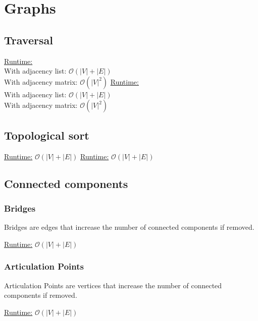 \section{Graphs}
\subsection{Traversal}

\underline{Runtime:}\\
With adjacency list: $\mathcal{O}(\lvert V \rvert + \lvert E \rvert)$ \\
With adjacency matrix: $\mathcal{O}(\lvert V \rvert^2)$
\underline{Runtime:}\\
With adjacency list: $\mathcal{O}(\lvert V \rvert + \lvert E \rvert)$ \\
With adjacency matrix: $\mathcal{O}(\lvert V \rvert^2)$

\subsection{Topological sort}

\underline{Runtime:} $\mathcal{O}(\lvert V \rvert + \lvert E \rvert)$
\underline{Runtime:} $\mathcal{O}(\lvert V \rvert + \lvert E \rvert)$

\subsection{Connected components}

\subsubsection{Bridges}

Bridges are edges that increase the number of connected components if
removed.

\underline{Runtime:} $\mathcal{O}(\lvert V \rvert + \lvert E \rvert)$

\subsubsection{Articulation Points}

Articulation Points are vertices that increase the number of connected
components if removed.

\underline{Runtime:} $\mathcal{O}(\lvert V \rvert + \lvert E \rvert)$

